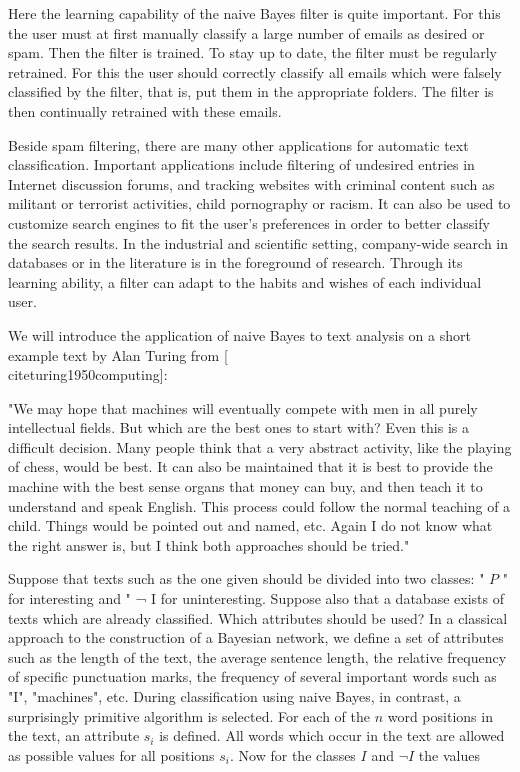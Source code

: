 \documentclass[10pt]{book}
\begin{document}
Here the learning capability of the naive Bayes filter is quite important. For this the user must at first manually classify a large number of emails as desired or spam. Then the filter is trained. To stay up to date, the filter must be regularly retrained. For this the user should correctly classify all emails which were falsely classified by the filter, that is, put them in the appropriate folders. The filter is then continually retrained with these emails.


Beside spam filtering, there are many other applications for automatic text classification. Important applications include filtering of undesired entries in Internet discussion forums, and tracking websites with criminal content such as militant or terrorist activities, child pornography or racism. It can also be used to customize search engines to fit the user's preferences in order to better classify the search results. In the industrial and scientific setting, company-wide search in databases or in the literature is in the foreground of research. Through its learning ability, a filter can adapt to the habits and wishes of each individual user.

We will introduce the application of naive Bayes to text analysis on a short example text by Alan Turing from [\\cite{turing1950computing}]:

\begin{displayquote}
"We may hope that machines will eventually compete with men in all purely intellectual fields. But which are the best ones to start with? Even this is a difficult decision. Many people think that a very abstract activity, like the playing of chess, would be best. It can also be maintained that it is best to provide the machine with the best sense organs that money can buy, and then teach it to understand and speak English. This process could follow the normal teaching of a child. Things would be pointed out and named, etc. Again I do not know what the right answer is, but I think both approaches should be tried."
\end{displayquote}

Suppose that texts such as the one given should be divided into two classes: " $P$ " for interesting and " ¬ I for uninteresting. Suppose also that a database exists of texts which are already classified. Which attributes should be used? In a classical approach to the construction of a Bayesian network, we define a set of attributes such as the length of the text, the average sentence length, the relative frequency of specific punctuation marks, the frequency of several important words such as "I", "machines", etc. During classification using naive Bayes, in contrast, a surprisingly primitive algorithm is selected. For each of the $n$ word positions in the text, an attribute $s_{i}$ is defined. All words which occur in the text are allowed as possible values for all positions $s_{i}$. Now for the classes $I$ and $\neg I$ the values
\end{document}
